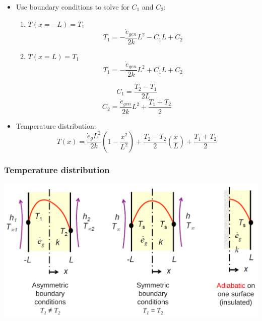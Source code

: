 \documentclass[11pt]{article}
\begin{document}
 \newpage

\begin{itemize}
\item Use boundary conditions to solve for \(C_1\) and \(C_2\):
\begin{enumerate}
\item \(T(x = -L) = T_1\)
\[T_1 = - \frac{\dot{e}_{gen}}{2k} L^2 - C_1 L + C_2\]
\item \(T(x = L) = T_1\)
\[T_1 = - \frac{\dot{e}_{gen}}{2k} L^2 + C_1 L + C_2\]
\end{enumerate}
\[C_1 = \frac{T_2 - T_1}{2L}\]
\[C_2 = \frac{\dot{e}_{gen}}{2k} L^2 + \frac{T_1 + T_2}{2}\]
\item Temperature distribution:
\[T(x) = \frac{\dot{e}_g L^2}{2k} \left(1 - \frac{x^2}{L^2} \right) + \frac{T_2 - T_2}{2} \left(\frac{x}{L} \right) + \frac{T_1 + T_2}{2}\]
\end{itemize}
\subsubsection{Temperature distribution}
\label{sec:org4f618d2}
\begin{center}
\includegraphics[width=.9\linewidth]{./images/steady-internal-heat-generation-temperature-distribution.png}
\end{center}

 \newpage
\end{document}
